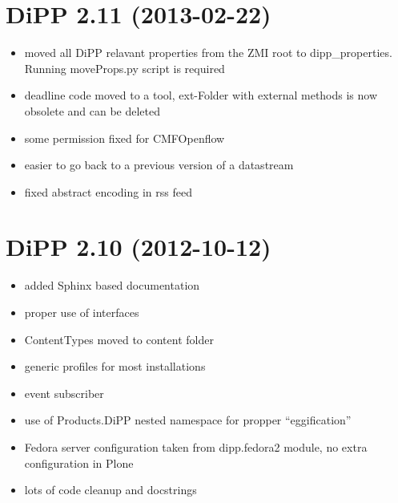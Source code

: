 \documentclass[a4paper,10pt,ngerman]{sphinxmanual}
\begin{document}
\section{DiPP 2.11 (2013-02-22)}
\label{changelog:dipp-2-11-2013-02-22}\begin{itemize}
\item {} 
moved all DiPP relavant properties from the ZMI root to
dipp\_properties. Running moveProps.py script is required

\item {} 
deadline code moved to a tool, ext-Folder with external methods
is now obsolete and can be deleted

\item {} 
some permission fixed for CMFOpenflow

\item {} 
easier to go back to a previous version of a datastream

\item {} 
fixed abstract encoding in rss feed

\end{itemize}


\section{DiPP 2.10 (2012-10-12)}
\label{changelog:dipp-2-10-2012-10-12}\begin{itemize}
\item {} 
added Sphinx based documentation

\item {} 
proper use of interfaces

\item {} 
ContentTypes moved to content folder

\item {} 
generic profiles  for most installations

\item {} 
event subscriber

\item {} 
use of Products.DiPP nested namespace for propper ``eggification''

\item {} 
Fedora server configuration taken from dipp.fedora2 module, no
extra configuration in Plone

\item {} 
lots of code cleanup and docstrings

\end{itemize}
\end{document}
